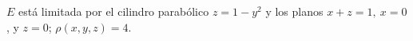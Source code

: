 \item $E$ está limitada por el cilindro parabólico $z = 1 - y^2$ y los planos $x + z = 1, \ x = 0$, y $z = 0$; $\rho(x, y, z) = 4$.
